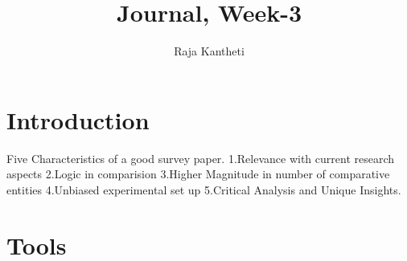 \documentclass{article}
\title{Journal, Week-3}
\author{Raja Kantheti}
\begin{document}
\maketitle

\section{Introduction}
Five Characteristics of a good survey paper.
1.Relevance with current research aspects
2.Logic in comparision
3.Higher Magnitude in number of comparative entities
4.Unbiased experimental set up 
5.Critical Analysis and Unique Insights. 


\section{Tools}




\end{document}
